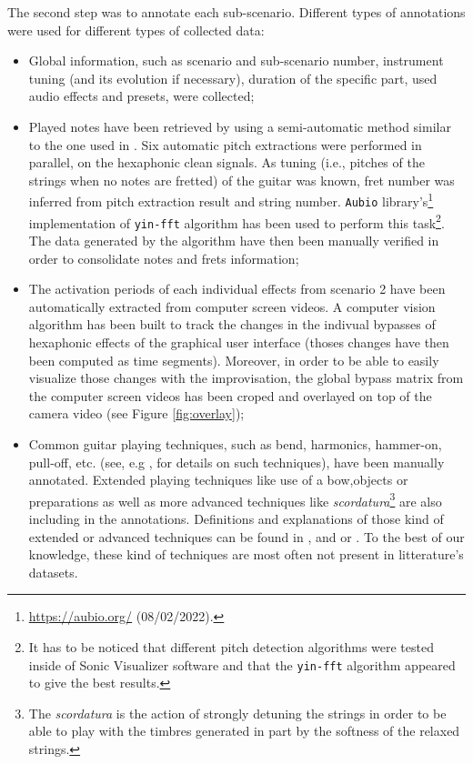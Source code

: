 \documentclass{article}
\begin{document}
The second step was to annotate each sub-scenario. Different types of annotations were used for different types of collected data: 
\begin{itemize}
\item Global information, such as scenario and sub-scenario number, instrument tuning (and its evolution if necessary), duration of the specific part, used audio effects and presets, were collected;

\item Played notes have been retrieved by using a semi-automatic method similar to the one used in \cite{sci:Xi2018}. Six automatic pitch extractions were performed in parallel, on the hexaphonic clean signals. As tuning (i.e., pitches of the strings when no notes are fretted) of the guitar was known, fret number was inferred from pitch extraction result and string number.  \texttt{Aubio} library's\footnote{\url{https://aubio.org/} (08/02/2022).} implementation of \texttt{yin-fft} algorithm \cite{sci:Brossier_yinFFT} has been used to perform this task\footnote{It has to be noticed that different pitch detection algorithms were tested inside of Sonic Visualizer software and that the \texttt{yin-fft} algorithm appeared to give the best results. }. The data generated by the algorithm have then been manually verified in order to consolidate notes and frets information; 

\item The activation periods of each individual effects from scenario 2 have been automatically extracted from computer screen videos. A computer vision algorithm has been built to track the changes in the indivual bypasses of hexaphonic effects of the graphical user interface (thoses changes have then been computed as time segments). Moreover, in order to be able to easily visualize those changes with the improvisation, the global bypass matrix from the computer screen videos has been croped and overlayed on top of the camera video (see Figure \ref{fig:overlay});

\item Common guitar playing techniques, such as bend, harmonics, hammer-on, pull-off, etc. (see, e.g \cite{sci:Su2014a}, for details on such techniques), have been manually annotated. Extended playing techniques like use of a bow,objects or preparations as well as more advanced techniques like \textit{scordatura}\footnote{The \textit{scordatura} is the action of strongly detuning the strings in order to be able to play with
the timbres generated in part by the softness of the relaxed strings.} are also including in the annotations. Definitions and explanations of those kind of extended or advanced techniques can be found in \cite{Josel2014},  \cite{organo:schndeider2015_microtones} and \cite{organo:Landman2012} or \cite{organo:ElgartYates1990}. To the best of our knowledge, these kind of techniques are most often not present in litterature's datasets.
\end{itemize}
\end{document}
